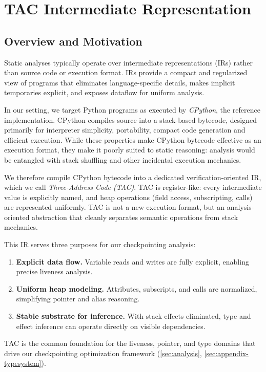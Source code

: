 \section{TAC Intermediate Representation}
\label{sec:appendix-tac-ir}

\subsection{Overview and Motivation}

Static analyses typically operate over intermediate representations (IRs) rather than source code or execution format. IRs provide a compact and regularized view of programs that eliminates language-specific details, makes implicit temporaries explicit, and exposes dataflow for uniform analysis.

In our setting, we target Python programs as executed by \emph{CPython}, the reference implementation.  
CPython compiles source into a stack-based bytecode, designed primarily for interpreter simplicity, portability, compact code generation and efficient execution. 
While these properties make CPython bytecode effective as an execution format, they make it poorly suited to static reasoning: analysis would be entangled with stack shuffling and other incidental execution mechanics.

We therefore compile CPython bytecode into a dedicated verification-oriented IR, which we call \emph{Three-Address Code (TAC)}.  
TAC is register-like: every intermediate value is explicitly named, and heap operations (field access, subscripting, calls) are represented uniformly.  
TAC is not a new execution format, but an analysis-oriented abstraction that cleanly separates semantic operations from stack mechanics.

This IR serves three purposes for our checkpointing analysis:
\begin{enumerate}
    \item \textbf{Explicit data flow.} Variable reads and writes are fully explicit, enabling precise liveness analysis.
    \item \textbf{Uniform heap modeling.} Attributes, subscripts, and calls are normalized, simplifying pointer and alias reasoning.
    \item \textbf{Stable substrate for inference.} With stack effects eliminated, type and effect inference can operate directly on visible dependencies.
\end{enumerate}

TAC is the common foundation for the liveness, pointer, and type domains that drive our checkpointing optimization framework (\autoref{sec:analysis}, \autoref{sec:appendix-typesystem}).

